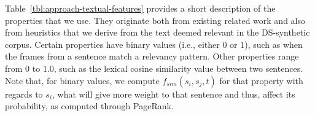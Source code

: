 Table~\ref{tbl:approach-textual-features} provides a short description of the properties that we use. 
They originate both from existing related work and also from heuristics that we derive from the text deemed relevant
in the \acs{DS-synthetic} corpus.
Certain properties have binary values (i.e., either $0$ or $1$), such as when the frames from a sentence 
match a relevancy pattern. Other properties range from $0$ to $1.0$, such as
the lexical cosine similarity value between two sentences.
Note that, for binary values, we compute $f_{sim}(s_i, s_j, t)$ for that property
with regards to $s_i$, what will give more weight to that sentence and thus, affect 
its probability, as computed through PageRank.

















\clearpage


